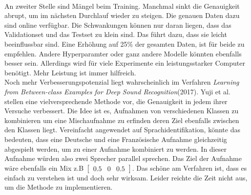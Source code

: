\\
An zweiter Stelle sind Mängel beim Training. Manchmal sinkt die Genauigkeit abrupt, um im nächsten Durchlauf wieder zu steigen. Die genauen Daten dazu sind online verfügbar. Die Schwankungen können nur daran liegen, dass das Validationset und das Testset zu klein sind. Das führt dazu, dass sie leicht beeinflussbar sind. Eine Erhöhung auf 25\% der gesamten Daten, ist für beide zu empfehlen. Andere Hyperparamter oder ganz andere Modelle könnten ebenfalls besser sein. Allerdings wird für viele Experimente ein leistungsstarker Computer benötigt. Mehr Leistung ist immer hilfreich.
\\
Noch mehr Verbesserungspotenzial liegt wahrscheinlich im Verfahren \textit{Learning from Between-class Examples for Deep Sound Recognition}(2017)\parencite{between}. Yuji et al. stellen eine vielversprechende Methode vor, die Genauigkeit in jedem ihrer Versuche verbessert. Die Idee ist es, Aufnahmen von verschiedenen Klassen zu kombinieren um eine Mischaufnahme zu erfinden deren Ziel ebenfalls zwischen den Klassen liegt. Vereinfacht angewendet auf Sprachidentifikation, könnte das bedeuten, dass eine Deutsche und eine Französische Aufnahme gleichzeitig abgespielt werden, um zu einer Aufnahme kombiniert zu werden. In dieser Aufnahme würden also zwei Sprecher parallel sprechen. Das Ziel der Aufnahme wäre ebenfalls ein Mix z.B $\begin{bmatrix}0.5 & 0 & 0.5 \end{bmatrix}$. Das schöne am Verfahren ist, dass es einfach zu verstehen ist und doch sehr wirksam. Leider reichte die Zeit nicht aus, um die Methode zu implementieren.
\\ \\ 
